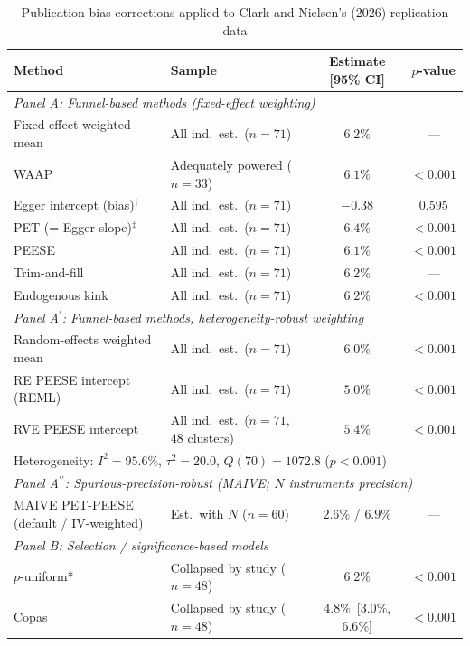 \begin{table}[htbp]
\centering
\caption{Publication-bias corrections applied to Clark and Nielsen's (2026) replication data}
\label{tab:summary}
\footnotesize
\begin{tabular}{llcc}
\toprule
Method & Sample & Estimate [95\% CI] & $p$-value \\
\midrule
\multicolumn{4}{l}{\textit{Panel A: Funnel-based methods (fixed-effect weighting)}} \\
  Fixed-effect weighted mean   & All ind.\ est.\ ($n=71$) & $6.2\%$ & --- \\
  WAAP                         & Adequately powered ($n=33$) & $6.1\%$ & $<0.001$ \\
  Egger intercept (bias)$^{\dag}$ & All ind.\ est.\ ($n=71$) & $-0.38$ & $0.595$ \\
  PET (= Egger slope)$^{\ddag}$ & All ind.\ est.\ ($n=71$) & $6.4\%$ & $<0.001$ \\
  PEESE                        & All ind.\ est.\ ($n=71$) & $6.1\%$ & $<0.001$ \\
  Trim-and-fill                & All ind.\ est.\ ($n=71$) & $6.2\%$ & --- \\
  Endogenous kink              & All ind.\ est.\ ($n=71$) & $6.2\%$ & $<0.001$ \\
\midrule
\multicolumn{4}{l}{\textit{Panel A$^\prime$: Funnel-based methods, heterogeneity-robust weighting}} \\
  Random-effects weighted mean & All ind.\ est.\ ($n=71$) & $6.0\%$ & $<0.001$ \\
  RE PEESE intercept (REML)    & All ind.\ est.\ ($n=71$) & $5.0\%$ & $<0.001$ \\
  RVE PEESE intercept          & All ind.\ est.\ ($n=71$, 48 clusters) & $5.4\%$ & $<0.001$ \\
  \multicolumn{4}{l}{\quad Heterogeneity: $I^2 = 95.6\%$, $\tau^2 = 20.0$, $Q(70) = 1072.8$ ($p<0.001$)} \\[4pt]
\midrule
\multicolumn{4}{l}{\textit{Panel A$^{\prime\prime}$: Spurious-precision-robust (MAIVE; $N$ instruments precision)}} \\
  MAIVE PET-PEESE (default / IV-weighted) & Est.\ with $N$ ($n=60$) & $2.6\%$ / $6.9\%$ & --- \\
\midrule
\multicolumn{4}{l}{\textit{Panel B: Selection / significance-based models}} \\
  $p$-uniform*                 & Collapsed by study ($n=48$) & $6.2\%$ & $<0.001$ \\
  Copas                        & Collapsed by study ($n=48$) & $4.8\%$~[$3.0\%$, $6.6\%$] & $<0.001$ \\

\end{tabular}
\end{table}
